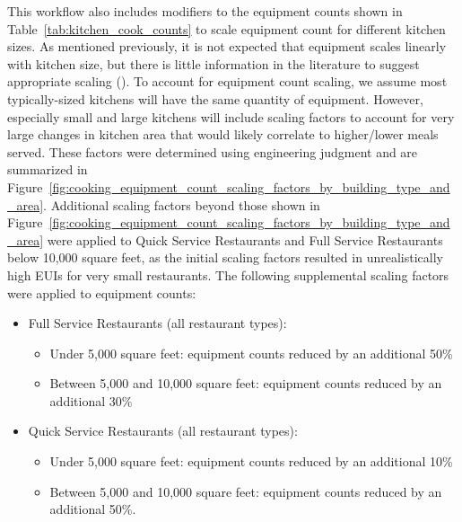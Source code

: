 This workflow also includes modifiers to the equipment counts shown in Table~\ref{tab:kitchen_cook_counts} to scale equipment count for different kitchen sizes. As mentioned previously, it is not expected that equipment scales linearly with kitchen size, but there is little information in the literature to suggest appropriate scaling (\cite{qsr_50pct_svs}). To account for equipment count scaling, we assume most typically-sized kitchens will have the same quantity of equipment. However, especially small and large kitchens will include scaling factors to account for very large changes in kitchen area that would likely correlate to higher/lower meals served. These factors were determined using engineering judgment and are summarized in Figure~\ref{fig:cooking_equipment_count_scaling_factors_by_building_type_and_area}. Additional scaling factors beyond those shown in Figure~\ref{fig:cooking_equipment_count_scaling_factors_by_building_type_and_area} were applied to Quick Service Restaurants and Full Service Restaurants below 10,000 square feet, as the initial scaling factors resulted in unrealistically high EUIs for very small restaurants. The following supplemental scaling factors were applied to equipment counts:
\begin{itemize}
\item Full Service Restaurants (all restaurant types): \\
    \begin{itemize}
    \item Under 5,000 square feet: equipment counts reduced by an additional 50\% \\
    \item Between 5,000 and 10,000 square feet: equipment counts reduced by an additional 30\% \\
    \end{itemize}
\item Quick Service Restaurants (all restaurant types): \\
    \begin{itemize}
    \item Under 5,000 square feet: equipment counts reduced by an additional 10\% \\
    \item Between 5,000 and 10,000 square feet: equipment counts reduced by an additional 50\%. \\
    \end{itemize}
\end{itemize}

